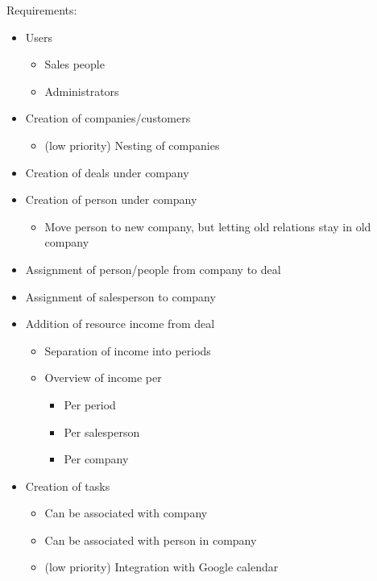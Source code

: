 Requirements:
\begin{itemize}
  \item Users
  \begin{itemize}
    \item Sales people
    \item Administrators
  \end{itemize}
  \item Creation of companies/customers
  \begin{itemize}
    \item (low priority) Nesting of companies
  \end{itemize}
  \item Creation of deals under company
  \item Creation of person under company
  \begin{itemize}
    \item Move person to new company, but letting old relations stay in old company
  \end{itemize}
  \item Assignment of person/people from company to deal
  \item Assignment of salesperson to company
  \item Addition of resource income from deal
  \begin{itemize}
    \item Separation of income into periods
    \item Overview of income per
    \begin{itemize}
      \item Per period
      \item Per salesperson
      \item Per company
    \end{itemize}
  \end{itemize}
  \item Creation of tasks
  \begin{itemize}
    \item Can be associated with company
    \item Can be associated with person in company
    \item (low priority) Integration with Google calendar
  \end{itemize}
\end{itemize}
